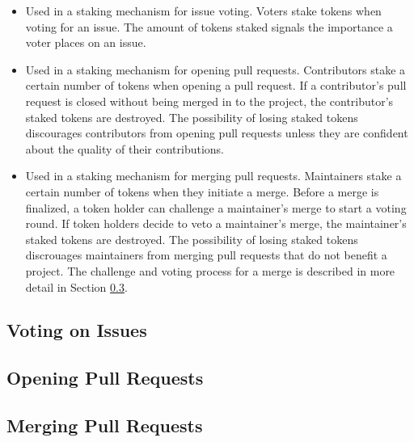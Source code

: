 \begin{itemize}
  \item Used in a staking mechanism for issue voting. Voters stake tokens when
    voting for an issue. The amount of tokens staked signals the importance a
    voter places on an issue.
  \item Used in a staking mechanism for opening pull requests. Contributors
    stake a certain number of tokens when opening a pull request. If a
    contributor's pull request is closed without being merged in to the project,
    the contributor's staked tokens are destroyed. The possibility of losing
    staked tokens discourages contributors from opening pull requests unless
    they are confident about the quality of their contributions.
  \item Used in a staking mechanism for merging pull requests. Maintainers stake
    a certain number of tokens when they initiate a merge. Before a merge is
    finalized, a token holder can challenge a maintainer's merge to start a
    voting round. If token holders decide to veto a maintainer's merge, the
    maintainer's staked tokens are destroyed. The possibility of losing staked
    tokens discrouages maintainers from merging pull requests that do not
    benefit a project. The challenge and voting process for a merge is described
    in more detail in Section \ref{sec:merge}.
\end{itemize}

\subsection{Voting on Issues}

\subsection{Opening Pull Requests}

\subsection{Merging Pull Requests}
\label{sec:merge}
